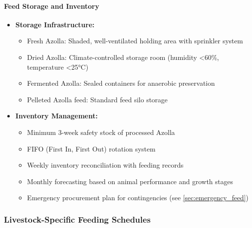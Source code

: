 \paragraph{Feed Storage and Inventory}
\begin{itemize}
    \item \textbf{Storage Infrastructure:}
    \begin{itemize}
        \item Fresh Azolla: Shaded, well-ventilated holding area with sprinkler system
        \item Dried Azolla: Climate-controlled storage room (humidity <60\%, temperature <25°C)
        \item Fermented Azolla: Sealed containers for anaerobic preservation
        \item Pelleted Azolla feed: Standard feed silo storage
    \end{itemize}
    \item \textbf{Inventory Management:}
    \begin{itemize}
        \item Minimum 3-week safety stock of processed Azolla
        \item FIFO (First In, First Out) rotation system
        \item Weekly inventory reconciliation with feeding records
        \item Monthly forecasting based on animal performance and growth stages
        \item Emergency procurement plan for contingencies (see \ref{sec:emergency_feed})
    \end{itemize}
\end{itemize}

\subsubsection{Livestock-Specific Feeding Schedules}
\label{sec:feeding_schedules}

